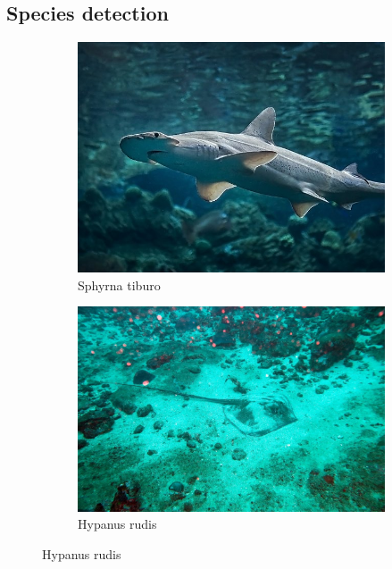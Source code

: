 \documentclass[10pt]{article}
\begin{document}
\subsection*{Species detection}

\begin{figure}[h]
     \centering
     \begin{subfigure}[b]{0.45\textwidth}
         \centering
         \includegraphics[width=\textwidth]{images/sphyrna_tiburo.jpg}
         \caption{Sphyrna tiburo}
     \end{subfigure}
     \hfill
     \begin{subfigure}[b]{0.45\textwidth}
         \centering
         \includegraphics[width=\textwidth]{images/hypanus_rudis.jpg}
         \caption{Hypanus rudis}
     \end{subfigure}

\end{figure}
\end{document}
